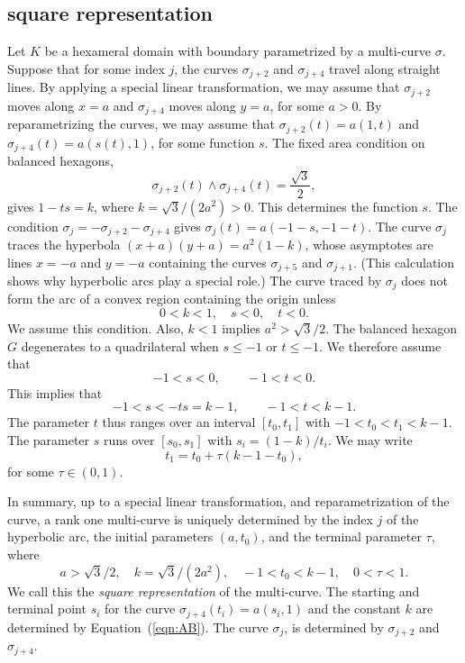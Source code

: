 \documentclass[11pt]{amsart}
\def\ta{{\tau}}
\begin{document}
\subsection{square representation}

Let $K$ be a hexameral domain with boundary parametrized by a multi-curve $\sigma$.
Suppose that for some index $j$, the curves $\sigma_{j+2}$ and $\sigma_{j+4}$ travel along straight lines.
By applying a special linear transformation, we may assume that $\sigma_{j+2}$ moves along
$x=a$ and $\sigma_{j+4}$ moves along $y=a$, for some $a>0$.  
By reparametrizing the curves, we may assume
that $\sigma_{j+2}(t) = a(1,t)$ and $\sigma_{j+4}(t) = a(s(t),1)$, for some function $s$.  The fixed area condition 
on balanced hexagons, 
\begin{equation}
{\sigma_{j+2}(t)}\land{\sigma_{j+4}(t)}=\frac{\sqrt{3}}2,
\end{equation}
gives $1- t s = k$, where $k=\sqrt3/(2a^2) > 0$.  This determines the function $s$.  The condition $\sigma_{j} = -\sigma_{j+2} -\sigma_{j+4}$
gives $\sigma_{j}(t) = a (-1-s,-1-t)$.  The curve $\sigma_{j}$ 
traces the hyperbola $(x+a)(y+a) = a^2(1-k)$,
whose asymptotes are lines $x=-a$ and $y=-a$ containing the curves $\sigma_{j+5}$ and $\sigma_{j+1}$.
(This calculation shows why hyperbolic arcs play a special role.)
The curve traced by $\sigma_{j}$ does not form the arc of a convex region containing the origin unless
   \begin{equation}
   0 < k < 1,\quad s<0,\quad t < 0.
   \end{equation}
We assume this condition.
Also, $k<1$ implies $a^2 > \sqrt3/2$.  The balanced hexagon $G$ degenerates
to a quadrilateral when $s \le -1$ or $t\le -1$.  We therefore assume
that 
\begin{equation}
-1<s < 0,\qquad -1 < t < 0.
\end{equation}
  This implies that
\begin{equation}
-1 < s < -t s = k-1,\qquad -1 < t < k-1.
\end{equation}  
The parameter $t$ thus ranges
over an interval $[t_0,t_1]$ with $-1 < t_0 < t_1 < k-1$.  The parameter
$s$ runs over $[s_0,s_1]$ with $s_i = (1-k)/t_i$.  We may
write 
\begin{equation}
t_1 = t_0 + \ta (k-1-t_0),
\end{equation}
for some $\ta\in (0,1)$.

In summary, up to a special linear transformation, and reparametrization of the curve, a rank one multi-curve is uniquely determined by the index $j$ of the hyperbolic arc,
the initial parameters $(a,t_0)$, and the terminal parameter $\ta$, where
  \begin{equation}\label{eqn:atu}
  a > \sqrt{3}/2,\quad  k = \sqrt{3}/(2a^2),\quad -1 < t_0 < k - 1,
  \quad 0 < \ta < 1.
  \end{equation}
We call this the {\it square representation} of the multi-curve.
The starting and terminal point $s_i$ for the curve $\sigma_{j+4}(t_i) = a(s_i,1)$ and the constant $k$ are determined by Equation~(\ref{eqn:AB}).  The curve $\sigma_{j}$, is determined by $\sigma_{j+2}$ and $\sigma_{j+4}$. 
\end{document}
